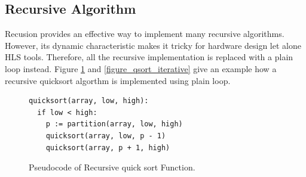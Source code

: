 \documentclass[conference]{IEEEtran}
\begin{document}


\subsection{Recursive Algorithm}

Recusion provides an effective way to implement many recursive algorithms. However, its dynamic characteristic makes it tricky for hardware design let alone HLS tools. Therefore, all the recursive implementation is replaced with a plain loop instead. Figure \ref{figure_qsort_recursive} and \ref{figure_qsort_iterative} give an example how a recursive quicksort algorthm is implemented using plain loop.

\begin{figure}[htb]\centering
{\fontsize{8}{8}\selectfont
\begin{lstlisting}[frame=lines]
quicksort(array, low, high):
  if low < high:
    p := partition(array, low, high)
    quicksort(array, low, p - 1)
    quicksort(array, p + 1, high)
\end{lstlisting}
}
\caption{Pseudocode of Recursive quick sort Function.}\label{figure_qsort_recursive}
\end{figure}
\end{document}
